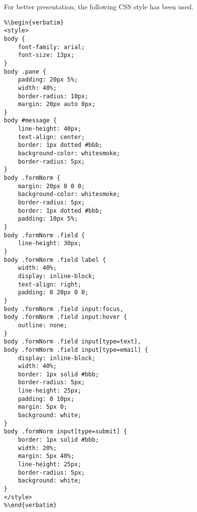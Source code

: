 For better presentation, the following CSS style has been used.

\begin{lstlisting}
%\begin{verbatim}
<style>
body {
    font-family: arial;
    font-size: 13px;
}
body .pane {
    padding: 20px 5%;
    width: 40%;
    border-radius: 10px;
    margin: 20px auto 0px;
}
body #message {
    line-height: 40px;
    text-align: center;
    border: 1px dotted #bbb;
    background-color: whitesmoke;
    border-radius: 5px;
}
body .formNorm {
    margin: 20px 0 0 0;
    background-color: whitesmoke;
    border-radius: 5px;
    border: 1px dotted #bbb;
    padding: 10px 5%;
}
body .formNorm .field {
    line-height: 30px;
}
body .formNorm .field label {
    width: 40%;
    display: inline-block;
    text-align: right;
    padding: 0 20px 0 0;
}
body .formNorm .field input:focus,
body .formNorm .field input:hover {
    outline: none;
}
body .formNorm .field input[type=text],
body .formNorm .field input[type=email] {
    display: inline-block;
    width: 40%;
    border: 1px solid #bbb;
    border-radius: 5px;
    line-height: 25px;
    padding: 0 10px;
    margin: 5px 0;
    background: white;
}
body .formNorm input[type=submit] {
    border: 1px solid #bbb;
    width: 20%;
    margin: 5px 40%;
    line-height: 25px;
    border-radius: 5px;
    background: white;
}
</style>
%\end{verbatim}
\end{lstlisting}

